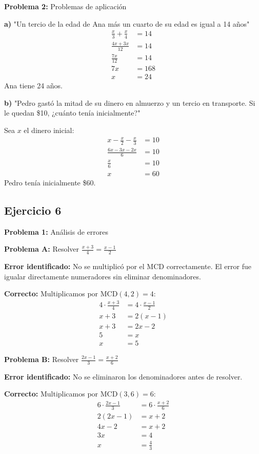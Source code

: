 \textbf{Problema 2:} Problemas de aplicación

\textbf{a)} "Un tercio de la edad de Ana más un cuarto de su edad es igual a 14 años"
\begin{align}
\frac{x}{3} + \frac{x}{4} &= 14\\
\frac{4x + 3x}{12} &= 14\\
\frac{7x}{12} &= 14\\
7x &= 168\\
x &= 24
\end{align}
Ana tiene 24 años.

\textbf{b)} "Pedro gastó la mitad de su dinero en almuerzo y un tercio en transporte. Si le quedan \$10, ¿cuánto tenía inicialmente?"

Sea $x$ el dinero inicial:
\begin{align}
x - \frac{x}{2} - \frac{x}{3} &= 10\\
\frac{6x - 3x - 2x}{6} &= 10\\
\frac{x}{6} &= 10\\
x &= 60
\end{align}
Pedro tenía inicialmente \$60.

\subsection*{Ejercicio 6}

\textbf{Problema 1:} Análisis de errores

\textbf{Problema A:} Resolver $\frac{x+3}{4} = \frac{x-1}{2}$

\textbf{Error identificado:} No se multiplicó por el MCD correctamente. El error fue igualar directamente numeradores sin eliminar denominadores.

\textbf{Correcto:}
Multiplicamos por MCD$(4,2) = 4$:
\begin{align}
4 \cdot \frac{x+3}{4} &= 4 \cdot \frac{x-1}{2}\\
x + 3 &= 2(x - 1)\\
x + 3 &= 2x - 2\\
5 &= x\\
x &= 5
\end{align}

\textbf{Problema B:} Resolver $\frac{2x-1}{3} = \frac{x+2}{6}$

\textbf{Error identificado:} No se eliminaron los denominadores antes de resolver.

\textbf{Correcto:}
Multiplicamos por MCD$(3,6) = 6$:
\begin{align}
6 \cdot \frac{2x-1}{3} &= 6 \cdot \frac{x+2}{6}\\
2(2x-1) &= x + 2\\
4x - 2 &= x + 2\\
3x &= 4\\
x &= \frac{4}{3}
\end{align}


